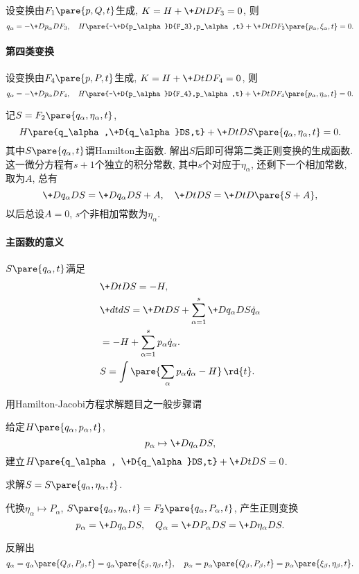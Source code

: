 \documentclass{ctexart}
\begin{document}
设变换由$F_1\pare{p,Q,t}$生成, $K = H + \displaystyle \+DtD{F_3} = 0$, 则
\[ q_\alpha = -\+D{p_\alpha}D{F_3},\quad H\pare{-\+D{p_\alpha}D{F_3},p_\alpha,t} + \+DtD{F_3\pare{p_\alpha,\xi_\alpha,t}} = 0. \]


\paragraph{第四类变换} %
\label{par:第四类变换}

设变换由$F_4\pare{p,P,t}$生成, $K = H + \displaystyle \+DtD{F_4} = 0$, 则
\[ q_\alpha = -\+D{p_\alpha}D{F_4},\quad H\pare{-\+D{p_\alpha}D{F_4},p_\alpha,t} + \+DtD{F_4\pare{p_\alpha,\eta_\alpha,t}} = 0. \]


记$S = F_2\pare{q_\alpha,\eta_\alpha,t}$,
\[ H\pare{q_\alpha,\+D{q_\alpha}DS,t} + \+DtD{S\pare{q_\alpha,\eta_\alpha,t}} = 0. \]
其中$S\pare{q_\alpha,t}$谓Hamilton主函数. 解出$S$后即可得第二类正则变换的生成函数. 这一微分方程有$s+1$个独立的积分常数, 其中$s$个对应于$\eta_\alpha$, 还剩下一个相加常数, 取为$A$, 总有
\[ \+D{q_\alpha}DS = \+D{q_\alpha}D{S+A},\quad \+DtDS = \+DtD{\pare{S+A}}, \]
以后总设$A = 0$, $s$个非相加常数为$\eta_\alpha$.

\paragraph{主函数的意义} %
\label{par:主函数的意义}

$S\pare{q_\alpha,t}$满足
\begin{align*}
    &\+DtDS = -H, \\
    & \+dtdS = \+DtDS + \sum_{\alpha=1}^s \+D{q_\alpha}DS\dot{q}_\alpha \\
    &= -H + \sum_{\alpha=1}^s p_\alpha\dot{q}_\alpha. \\
    & S= \int \pare{\sum_\alpha p_\alpha\dot{q}_\alpha - H}\,\rd{t}.
\end{align*}


用Hamilton-Jacobi方程求解题目之一般步骤谓
\begin{cenum}
    \item 给定$H\pare{q_\alpha,p_\alpha,t}$,
    \[ p_\alpha \mapsto \+D{q_\alpha}DS, \]
    建立$\displaystyle H\pare{q_\alpha, \+D{q_\alpha}DS,t} + \+DtDS = 0$.
    \item 求解$S = S\pare{q_\alpha,\eta_\alpha,t}$.
    \item 代换$\eta_\alpha \mapsto P_\alpha$, $S\pare{q_\alpha,\eta_\alpha,t} = F_2\pare{q_\alpha,P_\alpha,t}$, 产生正则变换
    \[ p_\alpha = \+D{q_\alpha}DS,\quad Q_\alpha = \+D{P_\alpha}DS = \+D{\eta_\alpha}DS. \]
    \item 反解出
    \[ q_\alpha = q_\alpha\pare{Q_\beta,P_\beta,t} = q_\alpha\pare{\xi_\beta,\eta_\beta,t}, \quad p_\alpha = p_\alpha\pare{Q_\beta,P_\beta,t} = p_\alpha\pare{\xi_\beta,\eta_\beta,t}. \]
\end{cenum}
\end{document}
